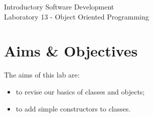 \documentclass[12pt,oneside]{cttutorial}
\begin{document}
\tutorialextra{}


 

\newcommand{\xkcd}[2]{
	\begin{center}
	\texttt{[image: ../../Figures/png/\#1]}
	\newline
	\url{http://xkcd.com/#2}
	\end{center}
	\bigskip
}

\newcommand{\alert}[1]
{\marginpar
  {\makebox[0 pt][l]
    {\texttt{[image: ../../Figures/png/warning.png]}
  }
  \parbox{2 cm}{{\sffamily \bfseries \tiny #1}}}}


\renewcommand{\baselinestretch}{1.5}
\textwidth=15cm

\newcommand{\I}{j}

\begin{center}
\begin{bfseries}
Introductory Software Development\\Laboratory 13 - Object Oriented Programming
\end{bfseries}
\end{center}

\section{Aims \& Objectives}

The aims of this lab are:

\begin{itemize}
\item to revise our basics of classes and objects;
\item to add simple constructors to classes.
\end{itemize}
\end{document}
